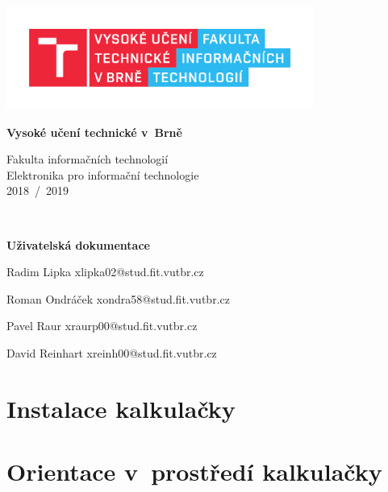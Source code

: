 \documentclass[12pt]{article}
\begin{document}
\begin{titlepage}
	\begin{center}

		\includegraphics[height = 96pt]{img/FIT_barevne_CMYK_CZ.pdf} \\

		\begin{LARGE}
			\textbf{Vysoké učení technické v~Brně} \\
		\end{LARGE}

		\begin{large}
			Fakulta informačních technologií \\
			Elektronika pro informační technologie \\
			2018~/~2019 
		\end{large}
		\\[78mm]

		\begin{huge}
				\textbf{Uživatelská dokumentace} \\
			\begin{large}		
		Radim Lipka xlipka02@stud.fit.vutbr.cz
		
        Roman Ondráček xondra58@stud.fit.vutbr.cz
        
        Pavel Raur xraurp00@stud.fit.vutbr.cz
        
        David Reinhart xreinh00@stud.fit.vutbr.cz
        \end{large}
		\end{huge}
	\end{center}

	\vfill


\end{titlepage}

\tableofcontents
\newpage

\section{Instalace kalkulačky}
\section{Orientace v~prostředí kalkulačky}
\end{document}
